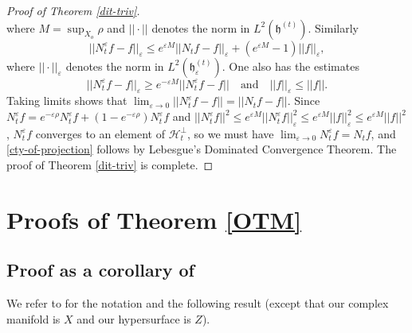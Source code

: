 \documentclass[12pt,hidelinks]{amsart}
\newcommand{\sH}{{\mathscr H}}
\newcommand{\fh}{{\mathfrak h}}
\newcommand{\ve}{\varepsilon}
\begin{document}
\begin{proof}[Proof of Theorem \ref{dit-triv}]
\[\]
where $M = \sup _{X_o} \rho$ and $|| \cdot ||$ denotes the norm in $L ^2(\fh^{(t)})$.  Similarly 
\[
||N_t^{\ve}f - f||_{\ve} \le e^{\ve M} ||N_tf- f||_{\ve} + (e^{\ve M} -1)||f||_{\ve},
\]
where $|| \cdot ||_{\ve}$ denotes the norm in $L ^2(\fh_{\ve}^{(t)})$.  One also has the estimates 
\[
||N_t ^{\ve}f - f||_{\ve} \ge e^{-\ve M} ||N_t ^{\ve}f - f|| \quad \text{and} \quad ||f||_{\ve} \le ||f||.
\]
Taking limits shows that $\displaystyle{\lim_{\ve \to 0} ||N_t^{\ve} f - f|| = ||N_tf-f||}$.  Since $N_t^{\ve}f = e^{-\ve \rho} N_t^{\ve} f + (1-e^{-\ve\rho})N_t^{\ve}f$ and $||N_t^{\ve}f ||^2 \le e^{\ve M} ||N_t^{\ve} f||^2_{\ve} \le e^{\ve M} ||f||^2_{\ve} \le e^{\ve M} ||f||^2$, $N_t^{\ve} f$ converges to an element of $\sH_t^{\perp}$, so we must have $\displaystyle{\lim_{\ve \to 0} N_t^{\ve}f = N_tf}$, and \eqref{cty-of-projection} follows by Lebesgue's Dominated Convergence Theorem.  The proof of Theorem \ref{dit-triv} is complete. 
\end{proof}


\section{Proofs of Theorem \ref{OTM}}\label{OTM-proofs-section}

\subsection{Proof as a corollary of \cite[Theorem 2.1]{gz}}

We refer to \cite{gz} for the notation and the following result (except that our complex manifold is $X$ and our hypersurface is $Z$).
\end{document}
